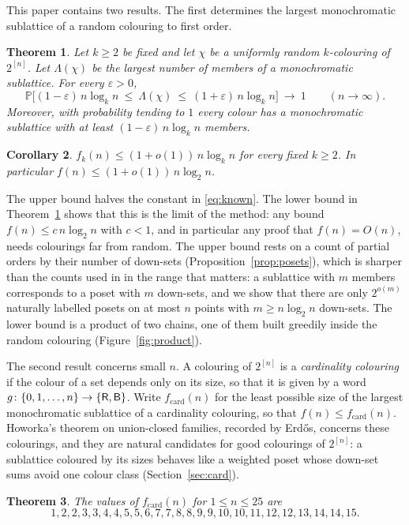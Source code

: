 \documentclass[11pt,reqno]{amsart}
\numberwithin{equation}{section}
\theoremstyle{plain}
\newtheorem{theorem}{Theorem}[section]
\newtheorem{corollary}[theorem]{Corollary}
\theoremstyle{definition}
\theoremstyle{remark}
\renewcommand{\Pr}{\mathbb{P}}
\newcommand{\eps}{\varepsilon}
\newcommand{\fc}{f_{\mathrm{card}}}
\newcommand{\w}[1]{\textsf{\upshape #1}}
\begin{document}
This paper contains two results. The first determines the largest
monochromatic sublattice of a random colouring to first order.

\begin{theorem}
\label{thm:random}
Let $k\ge2$ be fixed and let $\chi$ be a uniformly random $k$-colouring
of $2^{[n]}$. Let $\Lambda(\chi)$ be the largest number of members of a
monochromatic sublattice. For every $\eps>0$,
\[
\Pr\bigl[(1-\eps)\,n\log_kn\ \le\ \Lambda(\chi)\ \le\ (1+\eps)\,n\log_kn
\bigr]\ \longrightarrow\ 1\qquad(n\to\infty).
\]
Moreover, with probability tending to $1$ every colour has a
monochromatic sublattice with at least $(1-\eps)\,n\log_kn$ members.
\end{theorem}

\begin{corollary}
\label{cor:upper}
$f_k(n)\le(1+o(1))\,n\log_kn$ for every fixed $k\ge2$. In particular
$f(n)\le(1+o(1))\,n\log_2n$.
\end{corollary}

The upper bound halves the constant in \eqref{eq:known}. The lower bound in
Theorem~\ref{thm:random} shows that this is the limit of the method: any
bound $f(n)\le c\,n\log_2n$ with $c<1$, and in particular any proof that
$f(n)=O(n)$, needs colourings far from random. The upper bound rests on a
count of partial orders by their number of down-sets
(Proposition~\ref{prop:posets}), which is sharper than the counts used in
\cite{BMB26v5,Ch26} in the range that matters: a sublattice with $m$
members corresponds to a poset with $m$ down-sets, and we show that there
are only $2^{o(m)}$ naturally labelled posets on at most $n$ points with
$m\ge n\log_2n$ down-sets. The lower bound is a product of two chains,
one of them built greedily inside the random colouring
(Figure~\ref{fig:product}).

The second result concerns small $n$. A colouring of $2^{[n]}$ is a
\emph{cardinality colouring} if the colour of a set depends only on its
size, so that it is given by a word $g\colon\{0,1,\dots,n\}\to\{\w R,\w B\}$.
Write $\fc(n)$ for the least possible size of the largest monochromatic
sublattice of a cardinality colouring, so that $f(n)\le\fc(n)$. Howorka's
theorem on union-closed families, recorded by Erd\H{o}s, concerns these
colourings, and they are natural candidates for good colourings of
$2^{[n]}$: a sublattice coloured by its sizes behaves like a weighted poset
whose down-set sums avoid one colour class (Section~\ref{sec:card}).

\begin{theorem}
\label{thm:card}
The values of $\fc(n)$ for $1\le n\le25$ are
\[
1,2,2,3,3,4,4,5,5,6,7,7,8,8,9,9,10,10,11,12,12,13,14,14,15 .
\]
\end{theorem}
\end{document}
